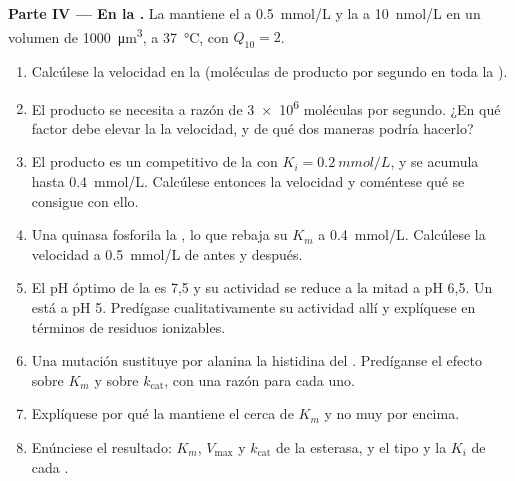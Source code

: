 \begin{problem}
\medskip
\noindent\textbf{Parte IV --- En la .}
La  mantiene el  a \qty{0.5}{mmol/L} y la  a
\qty{10}{nmol/L} en un volumen de \qty{1000}{\micro m^3}, a
\qty{37}{\celsius}, con $Q_{10} = 2$.
\begin{enumerate}[resume]
  \item Calcúlese la velocidad en la  (moléculas de producto por
        segundo en toda la ).
  \item El producto se necesita a razón de \qty{3e6}{} moléculas por
        segundo. ¿En qué factor debe elevar la  la velocidad, y de
        qué dos maneras podría hacerlo?
  \item El producto es un  competitivo de la  con
        $K_i = \qty{0.2}{mmol/L}$, y se acumula hasta \qty{0.4}{mmol/L}.
        Calcúlese entonces la velocidad y coméntese qué se consigue con
        ello.
  \item Una quinasa fosforila la , lo que rebaja su $K_m$ a
        \qty{0.4}{mmol/L}. Calcúlese la velocidad a \qty{0.5}{mmol/L} de
         antes y después.
  \item El pH óptimo de la  es 7,5 y su actividad se reduce a la
        mitad a pH 6,5. Un  está a pH 5. Predígase
        cualitativamente su actividad allí y explíquese en términos de
        residuos ionizables.
  \item Una mutación sustituye por alanina la histidina del .
        Predíganse el efecto sobre $K_m$ y sobre $k_{\text{cat}}$, con una
        razón para cada uno.
  \item Explíquese por qué la  mantiene el  cerca de $K_m$ y
        no muy por encima.
  \item Enúnciese el resultado: $K_m$, $V_{\max}$ y $k_{\text{cat}}$ de la
        esterasa, y el tipo y la $K_i$ de cada .
\end{enumerate}
\end{problem}
